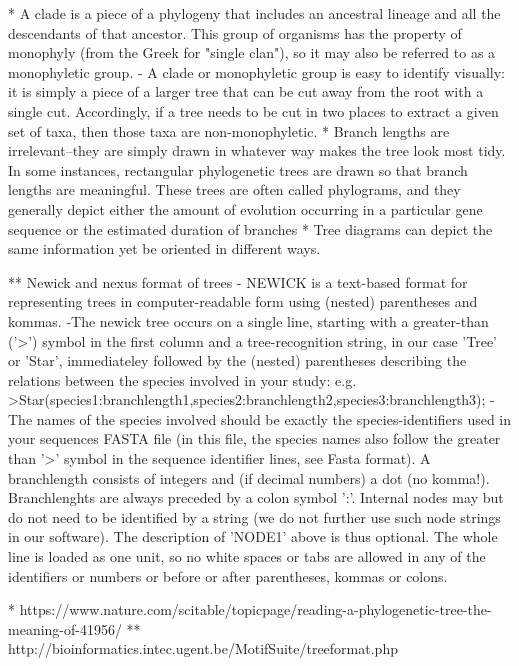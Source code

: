     * A clade is a piece of a phylogeny that includes an ancestral lineage and all the descendants of that ancestor. This group of organisms has the property of monophyly (from the Greek for "single clan"), so it may also be referred to as a monophyletic group.
        - A clade or monophyletic group is easy to identify visually: it is simply a piece of a larger tree that can be cut away from the root with a single cut. Accordingly, if a tree needs to be cut in two places to extract a given set of taxa, then those taxa are non-monophyletic. 
    * Branch lengths are irrelevant--they are simply drawn in whatever way makes the tree look most tidy.  In some instances, rectangular phylogenetic trees are drawn so that branch lengths are meaningful. These trees are often called phylograms, and they generally depict either the amount of evolution occurring in a particular gene sequence or the estimated duration of branches
    * Tree diagrams can depict the same information yet be oriented in different ways.

        ** Newick and nexus format of trees
        - NEWICK is a text-based format for representing trees in computer-readable form using (nested) parentheses and kommas. 
                -The newick tree occurs on a single line, starting with a greater-than ('>') symbol in the first column and a tree-recognition string, in our case 'Tree' or 'Star', immediateley followed by the (nested) parentheses describing the relations between the species involved in your study:
                e.g.
                        >Star(species1:branchlength1,species2:branchlength2,species3:branchlength3);
                -The names of the species involved should be exactly the species-identifiers used in your sequences FASTA file (in this file, the species names also follow the greater than '>' symbol in the sequence identifier lines, see Fasta format). A branchlength consists of integers and (if decimal numbers) a dot (no komma!). Branchlenghts are always preceded by a colon symbol ':'. Internal nodes may but do not need to be identified by a string (we do not further use such node strings in our software). The description of 'NODE1' above is thus optional. The whole line is loaded as one unit, so no white spaces or tabs are allowed in any of the identifiers or numbers or before or after parentheses, kommas or colons. 

* https://www.nature.com/scitable/topicpage/reading-a-phylogenetic-tree-the-meaning-of-41956/
** http://bioinformatics.intec.ugent.be/MotifSuite/treeformat.php

